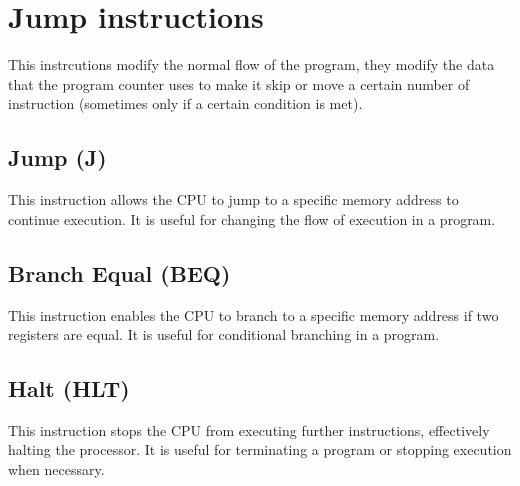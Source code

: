 \documentclass[9pt,a4paper,twoside]{tau}
\begin{document}
        \section{Jump instructions}
        This instrcutions modify the normal flow of the program, they modify the data that the program counter uses to make it skip or move a certain number of instruction (sometimes only if a certain condition is met).
        
        \subsection{Jump (J)}
        This instruction allows the CPU to jump to a specific memory address to continue execution. It is useful for changing the flow of execution in a program. 
        \subsection{Branch Equal (BEQ)}
        This instruction enables the CPU to branch to a specific memory address if two registers are equal. It is useful for conditional branching in a program. 
        \subsection{Halt (HLT)}
        This instruction stops the CPU from executing further instructions, effectively halting the processor. It is useful for terminating a program or stopping execution when necessary.
\end{document}
